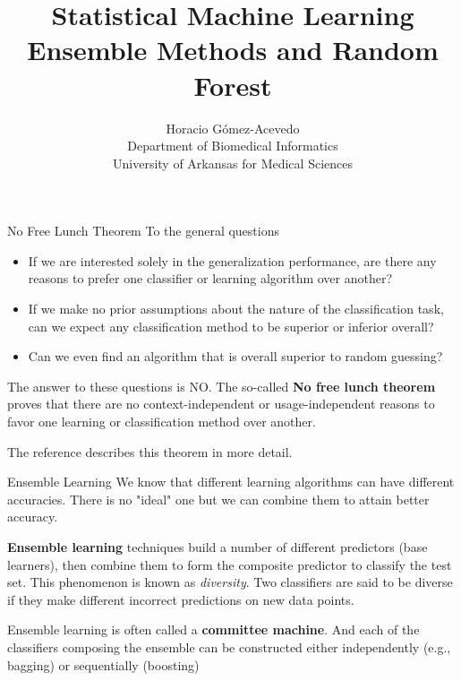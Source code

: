 \documentclass{beamer}
\title{Statistical Machine Learning\\ Ensemble Methods and Random Forest}
\author{Horacio G\'omez-Acevedo\\ Department of Biomedical Informatics\\
University of Arkansas for Medical Sciences}
\begin{document}
	\begin{frame}[plain]
		\maketitle
	\end{frame}

\begin{frame}{No Free Lunch Theorem}
	To the general questions
	\begin{itemize}
		\item If we are interested solely in the generalization performance, are there any reasons to prefer one classifier or learning algorithm over another?
		\item If we make no prior assumptions about the nature of the classification task, can we expect any classification method to be superior or inferior overall?
		\item Can we even find an algorithm that is overall superior to random guessing?
	\end{itemize}
The answer to these questions is NO. The so-called \textbf{No free lunch theorem} proves that there are no context-independent or usage-independent reasons to favor one learning or classification method over another. 

The reference \citep{duda} describes this theorem in more detail. 
\end{frame}

\begin{frame}{Ensemble Learning}
	We know that different learning algorithms can have different accuracies. There is no "ideal" one but we can combine them to attain better accuracy. 
	
	\textbf{Ensemble learning} techniques build a number of different predictors (base learners), then combine them to form the composite predictor to classify the test set. This phenomenon is known as \textit{diversity}. Two classifiers are said to be diverse if they make different incorrect predictions on new data points. 
	
	Ensemble learning is often called a \textbf{committee machine}. And each of the classifiers composing the ensemble can be constructed either independently (e.g., bagging) or sequentially (boosting)
\end{frame}
\end{document}
